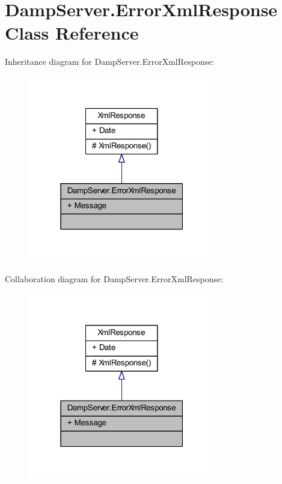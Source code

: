 \hypertarget{class_damp_server_1_1_error_xml_response}{\section{Damp\-Server.\-Error\-Xml\-Response Class Reference}
\label{class_damp_server_1_1_error_xml_response}
}


Inheritance diagram for Damp\-Server.\-Error\-Xml\-Response\-:\nopagebreak
\begin{figure}[H]
\begin{center}
\leavevmode
\includegraphics[width=232pt]{class_damp_server_1_1_error_xml_response__inherit__graph}
\end{center}
\end{figure}


Collaboration diagram for Damp\-Server.\-Error\-Xml\-Response\-:\nopagebreak
\begin{figure}[H]
\begin{center}
\leavevmode
\includegraphics[width=232pt]{class_damp_server_1_1_error_xml_response__coll__graph}
\end{center}
\end{figure}
